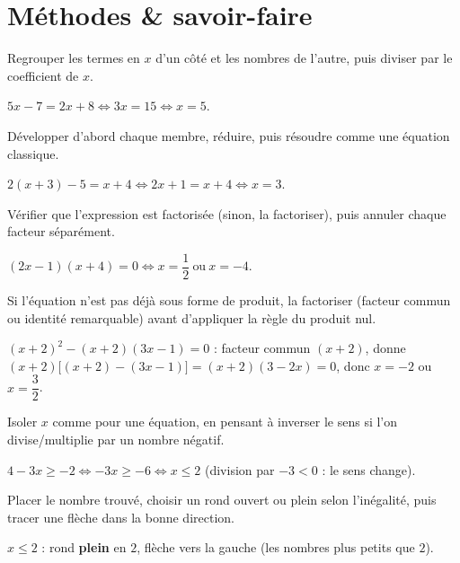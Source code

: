 \section{Méthodes \& savoir-faire}

Regrouper les termes en $x$ d'un côté et les nombres de l'autre, puis diviser par le
coefficient de $x$.
\begin{exemple}
$5x-7=2x+8 \iff 3x=15 \iff x=5$.
\end{exemple}

Développer d'abord chaque membre, réduire, puis résoudre comme une équation classique.
\begin{exemple}
$2(x+3)-5=x+4 \iff 2x+1=x+4 \iff x=3$.
\end{exemple}

Vérifier que l'expression est factorisée (sinon, la factoriser), puis annuler chaque facteur
séparément.
\begin{exemple}
$(2x-1)(x+4)=0 \iff x=\dfrac12\ \text{ou}\ x=-4$.
\end{exemple}

Si l'équation n'est pas déjà sous forme de produit, la factoriser (facteur commun ou identité
remarquable) avant d'appliquer la règle du produit nul.
\begin{exemple}
$(x+2)^{2}-(x+2)(3x-1)=0$ : facteur commun $(x+2)$, donne
$(x+2)\big[(x+2)-(3x-1)\big]=(x+2)(3-2x)=0$, donc $x=-2$ ou $x=\dfrac32$.
\end{exemple}

Isoler $x$ comme pour une équation, en pensant à inverser le sens si l'on divise/multiplie
par un nombre négatif.
\begin{exemple}
$4-3x\ge-2 \iff -3x\ge-6 \iff x\le2$ (division par $-3<0$ : le sens change).
\end{exemple}

Placer le nombre trouvé, choisir un rond ouvert ou plein selon l'inégalité, puis tracer une
flèche dans la bonne direction.
\begin{exemple}
$x\le2$ : rond \textbf{plein} en $2$, flèche vers la gauche (les nombres plus petits que
$2$).
\end{exemple}

